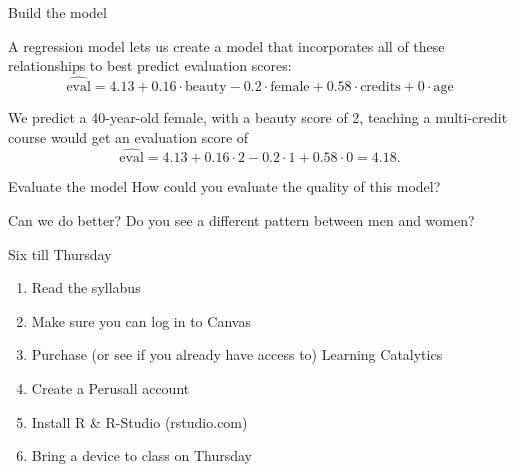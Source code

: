 \documentclass{beamer}\usepackage[]{graphicx}\usepackage[]{color}
\newenvironment{knitrout}{}{} %
\begin{document}
\begin{darkframes}
    \begin{frame}{Build the model}
      
      \begin{center}
        A regression model lets us create a model that incorporates all of these relationships to best predict evaluation scores:
        \[
          \widehat{\text{eval}} = 
            4.13 +
            0.16 \cdot \text{beauty} -
            0.2 \cdot \text{female} +
            0.58 \cdot \text{credits} +
            0 \cdot \text{age}
        \]
        
        \pause
          
        We predict a 40-year-old female, with a beauty score of 2, teaching a multi-credit course would get an evaluation score of 
        \[
          \widehat{\text{eval}} = 4.13 + 0.16 \cdot 2 - 0.2 \cdot 1 + 0.58 \cdot 0 = 4.18.
        \]
        
      \end{center}
    \end{frame}

    \begin{frame}{Evaluate the model}
      How could you evaluate the quality of this model?
    \end{frame}

    \begin{frame}{Can we do better?}
      Do you see a different pattern between men and women?

\begin{knitrout}


\end{knitrout}
    \end{frame}

    \begin{frame}{Six till Thursday}
      \begin{enumerate}
        \item Read the syllabus
        \item Make sure you can log in to Canvas
        \item Purchase (or see if you already have access to) Learning Catalytics
        \item Create a Perusall account
        \item Install R \& R-Studio (rstudio.com)
        \item Bring a device to class on Thursday
      \end{enumerate}
    \end{frame}


  \end{darkframes}
\end{document}
